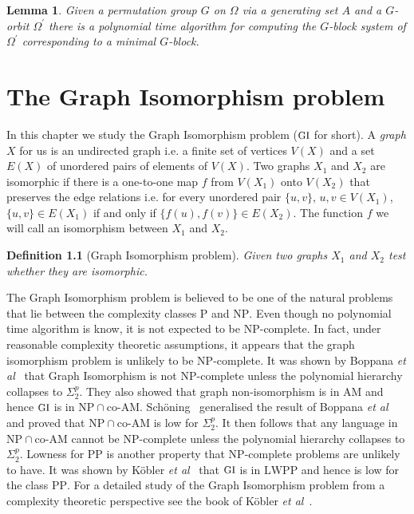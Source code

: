 \documentclass[11pt]{madras}%
\newtheorem{lemma}[theorem]{Lemma}
\newtheorem{definition}[theorem]{Definition}
\theoremstyle{remark}
\newcommand{\etal}[0]{{\emph{et al}}}
\newcommand{\ProblemFont}[1]{{\ensuremath{\textrm{\small #1}}}}
\begin{document}
\begin{lemma} Given a permutation group $G$ on $\Omega$ via a
  generating set $A$ and a $G$-orbit $\Omega^\prime$ there is a
  polynomial time algorithm for computing the $G$-block system of
  $\Omega^\prime$ corresponding to a minimal $G$-block.
\end{lemma}
\chapter{The Graph Isomorphism problem}
\label{chap-gi-in-spp}

In this chapter we study the Graph Isomorphism problem
($\ProblemFont{GI}$ for short).  A \emph{graph} $X$ for us is an
undirected graph i.e. a finite set of vertices $V(X)$ and a set $E(X)$
of unordered pairs of elements of $V(X)$.  Two graphs $X_1$ and $X_2$
are isomorphic if there is a one-to-one map $f$ from $V(X_1)$ onto
$V(X_2)$ that preserves the edge relations i.e. for every unordered
pair $\{ u,v \}$, $u,v \in V(X_1)$, $\{u,v\} \in E(X_1)$ if and only
if $\{ f(u),f(v) \} \in E(X_2)$. The function $f$ we will call an
isomorphism between $X_1$ and $X_2$.

\begin{definition}[Graph Isomorphism problem]
  Given two graphs $X_1$ and $X_2$ test whether they are isomorphic.
\end{definition}

The Graph Isomorphism problem is believed to be one of the natural
problems that lie between the complexity classes $\mathrm{P}$ and
$\mathrm{NP}$.  Even though no polynomial time algorithm is know, it
is not expected to be $\mathrm{NP}$-complete. In fact, under
reasonable complexity theoretic assumptions, it appears that the graph
isomorphism problem is unlikely to be $\mathrm{NP}$-complete. It was
shown by Boppana \etal~\cite{boppana87does} that Graph Isomorphism is
not $\mathrm{NP}$-complete unless the polynomial hierarchy collapses
to $\Sigma_2^p$.  They also showed that graph non-isomorphism is in
$\mathrm{AM}$ and hence $\ProblemFont{GI}$ is in $\mathrm{NP} \cap
\textrm{co-}\mathrm{AM}$.  Sch\"oning~\cite{schoning88graph}
generalised the result of Boppana \etal~\cite{boppana87does} and
proved that $\mathrm{NP}\cap \textrm{co-}\mathrm{AM}$ is low for
$\Sigma_2^p$. It then follows that any language in $\mathrm{NP} \cap
\textrm{co-}\mathrm{AM}$ cannot be $\mathrm{NP}$-complete unless the
polynomial hierarchy collapses to $\Sigma_2^p$.  Lowness for
$\mathrm{PP}$ is another property that $\mathrm{NP}$-complete problems
are unlikely to have. It was shown by K\"obler
\etal~\cite{kobler92graph} that $\ProblemFont{GI}$ is in
$\mathrm{LWPP}$ and hence is low for the class $\mathrm{PP}$.  For a
detailed study of the Graph Isomorphism problem {from} a complexity
theoretic perspective see the book of K\"obler \etal~\cite{gi-book}.
\end{document}
